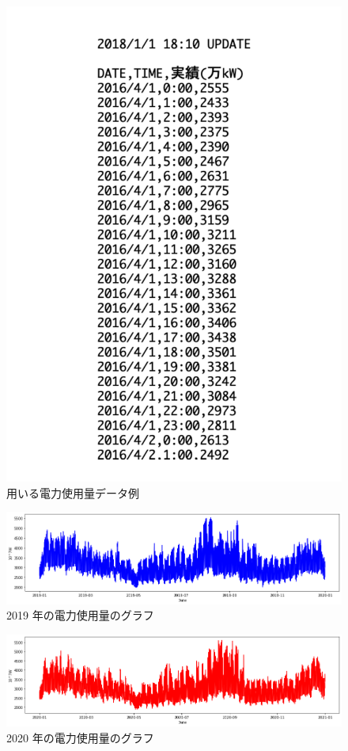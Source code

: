\begin{figure}[hb]
\centering
\includegraphics[scale=0.5]{exe_csv.pdf}
 \caption{用いる電力使用量データ例}
\end{figure}

\begin{figure}[hb]
\centering
\includegraphics[scale=0.5]{2019_W.png}
 \caption{2019 年の電力使用量のグラフ}
\end{figure}

\begin{figure}[hb]
\centering
\includegraphics[scale=0.5]{2020_W.png}
 \caption{2020 年の電力使用量のグラフ}
\end{figure}

